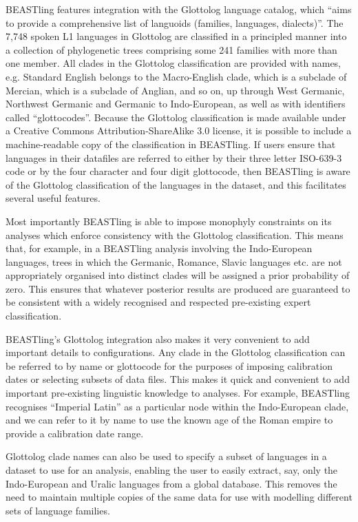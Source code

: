 \documentclass[twocolumn,10pt]{scrartcl}
\begin{document}
BEASTling features integration with the Glottolog language catalog\cite{Hammarstroem2015}, which ``aims to provide a comprehensive list of languoids (families, languages, dialects)''.  The 7,748 spoken L1 languages in Glottolog are classified in a principled manner into a collection of phylogenetic trees comprising some 241 families with more than one member.  All clades in the Glottolog classification are provided with names, e.g. Standard English belongs to the Macro-English clade, which is a subclade of Mercian, which is a subclade of Anglian, and so on, up through West Germanic, Northwest Germanic and Germanic to Indo-European, as well as with identifiers called ``glottocodes''.  Because the Glottolog classification is made available under a Creative Commons Attribution-ShareAlike 3.0 license, it is possible to include a machine-readable copy of the classification in BEASTling.  If users ensure that languages in their datafiles are referred to either by their three letter ISO-639-3 code or by the four character and four digit glottocode, then BEASTling is aware of the Glottolog classification of the languages in the dataset, and this facilitates several useful features.

Most importantly BEASTling is able to impose monophyly constraints on its analyses which enforce consistency with the Glottolog classification.  This means that, for example, in a BEASTling analysis involving the Indo-European languages, trees in which the Germanic, Romance, Slavic languages etc. are not appropriately organised into distinct clades will be assigned a prior probability of zero.  This ensures that whatever posterior results are produced are guaranteed to be consistent with a widely recognised and respected pre-existing expert classification.

BEASTling's Glottolog integration also makes it very convenient to add important details to configurations.  Any clade in the Glottolog classification can be referred to by name or glottocode for the purposes of imposing calibration dates or selecting subsets of data files.  This makes it quick and convenient to add important pre-existing linguistic knowledge to analyses.  For example, BEASTling recognises ``Imperial Latin'' as a particular node within the Indo-European clade, and we can refer to it by name to use the known age of the Roman empire to provide a calibration date range.

Glottolog clade names can also be used to specify a subset of languages in a dataset to use for an analysis, enabling the user to easily extract, say, only the Indo-European and Uralic languages from a global database.  This removes the need to maintain multiple copies of the same data for use with modelling different sets of language families.
\end{document}
